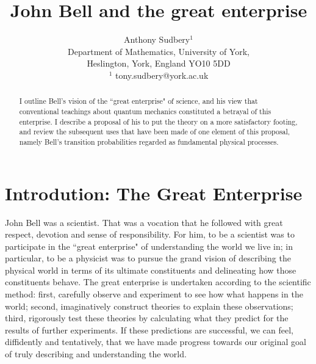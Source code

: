 \documentclass[12pt,a4paper,reqno]{article}
\renewcommand{\(}{\left(}
\renewcommand{\)}{\right)}
\renewcommand{\.}{\centerdot}
\newcommand{\1}{\mathbf{1}}
\newcommand{\<}{\langle}
\renewcommand{\>}{\rangle}
\theoremstyle{definition}
\theoremstyle{remark}
\numberwithin{equation}{section}
\begin{document}
\title{\bf{John Bell and the great enterprise}}

\author{Anthony Sudbery$^1$\\[10pt] \small Department of Mathematics,
University of York, \\[-2pt] \small Heslington, York, England YO10 5DD\\
\small $^1$ tony.sudbery@york.ac.uk}



\date{}

\maketitle

\begin{abstract}

 I outline  Bell's vision of the ``great enterprise" of science, and his view that conventional teachings about quantum mechanics constituted a betrayal of this enterprise. I describe a proposal of his to put the theory on a more satisfactory footing, and review the subsequent uses that have been made of one element of this proposal, namely Bell's transition probabilities regarded as fundamental physical processes.

\end{abstract}

\section{Introdution: The Great Enterprise}

John Bell was a scientist. That was a vocation that he followed with great respect, devotion and sense of responsibility. For him, to be a scientist was to participate in the ``great enterprise" \cite{Bell:piddling} of understanding the world we live in; in particular, to be a physicist was to pursue the grand vision of describing the physical world in terms of its ultimate constituents and delineating how those constituents behave. The great enterprise is undertaken according to the scientific method: first, carefully observe and experiment to see how what happens in the world; second, imaginatively construct theories to explain these observations; third, rigorously test these theories by calculating what they predict for the results of further experiments. If these predictions are successful, we can feel, diffidently and tentatively, that we have made progress towards our original goal of truly describing and understanding the world.
\end{document}
